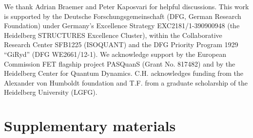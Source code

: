 \documentclass[aps,twocolumn,
superscriptaddress,
footinbib,
prl]{revtex4-1}
\begin{document}





We thank Adrian Braemer and Peter Kaposvari for helpful discussions.
This work is supported by the Deutsche Forschungsgemeinschaft (DFG, German Research Foundation) under Germany’s Excellence Strategy EXC2181/1-390900948 (the Heidelberg STRUCTURES Excellence Cluster), within the Collaborative Research Center SFB1225 (ISOQUANT) and the DFG Priority Program 1929 “GiRyd” (DFG WE2661/12-1). 
We acknowledge support by the European Commission FET flagship project PASQuanS (Grant No. 817482) and by the Heidelberg Center for Quantum Dynamics. C.H. acknowledges funding from the Alexander von Humboldt foundation and T.F. from a graduate scholarship of the Heidelberg University (LGFG).







\section{Supplementary materials}
\end{document}

